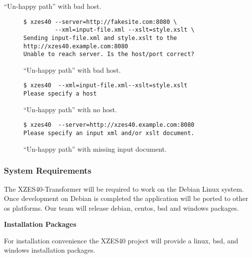 ``Un-happy path'' with bad host.
\begin{figure}
\begin{lstlisting}
$ xzes40 --server=http://fakesite.com:8080 \
         --xml=input-file.xml --xslt=style.xslt \
Sending input-file.xml and style.xslt to the http://xzes40.example.com:8080
Unable to reach server. Is the host/port correct?
\end{lstlisting}
\caption{``Un-happy path'' with bad host.}
\end{figure}

\begin{figure}
\begin{lstlisting}
$ xzes40  --xml=input-file.xml--xslt=style.xslt
Please specify a host
\end{lstlisting}
\caption{``Un-happy path'' with no host.}
\end{figure}

\begin{figure}
\begin{lstlisting}
$ xzes40  --server=http://xzes40.example.com:8080
Please specify an input xml and/or xslt document.
\end{lstlisting}
\caption{``Un-happy path'' with missing input document.}
\end{figure}

\subsubsection{System Requirements}
\label{system-requirements}

The XZES40-Transformer will be required to work on the Debian Linux system.
Once development on Debian is completed the application will be ported to other \gls{os} platforms.
Our team will release \gls{debian}, \gls{centos}, \gls{bsd} and \gls{windows} packages.
  
\textbf{Installation Packages}
\label{installation-packages}

For installation convenience the XZES40 project will provide a \gls{linux}, \gls{bsd}, and \gls{windows} installation packages.

